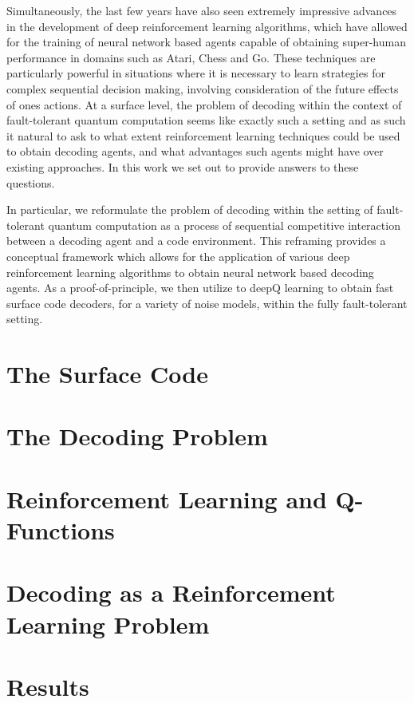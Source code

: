 \documentclass[onecolumn,preprintnumbers,amsmath,amssymb,notitlepage,nofootinbib,longbibliography,superscriptaddress]{revtex4-1}
\begin{document}
    Simultaneously, the last few years have also seen extremely impressive advances in the development of deep reinforcement learning algorithms, which have allowed for the training of neural network based agents capable of obtaining super-human performance in domains such as Atari, Chess and Go. These techniques are particularly powerful in situations where it is necessary to learn strategies for complex sequential decision making, involving consideration of the future effects of ones actions. At a surface level, the problem of decoding within the context of fault-tolerant quantum computation seems like exactly such a setting and as such it natural to ask to what extent reinforcement learning techniques could be used to obtain decoding agents, and what advantages such agents might have over existing approaches. In this work we set out to provide answers to these questions.

    In particular, we reformulate the problem of decoding within the setting of fault-tolerant quantum computation as a process of sequential competitive interaction between a decoding agent and a code environment. This reframing provides a conceptual framework which allows for the application of various deep reinforcement learning algorithms to obtain neural network based decoding agents. As a proof-of-principle, we then utilize to deepQ learning to obtain fast surface code decoders, for a variety of noise models, within the fully fault-tolerant setting.



\section{The Surface Code}\label{s:the_surface_code}
\section{The Decoding Problem}\label{s:the_decoding_problem}
\section{Reinforcement Learning and Q-Functions}\label{s:reinforcement_learning}
\section{Decoding as a Reinforcement Learning Problem}\label{s:decoding_as_rl}
\section{Results}\label{s:results}
\end{document}

